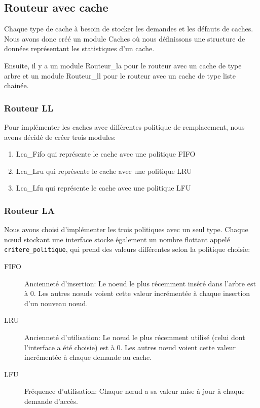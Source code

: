 \documentclass{article}
\begin{document}
\subsection{Routeur avec cache}
Chaque type de cache à besoin de stocker les demandes et les défauts de caches. Nous avons donc créé un module Caches où nous définissons une structure de données représentant les statistiques d'un cache.\par
Ensuite, il y a un module Routeur\_la pour le routeur avec un cache de type arbre et un module Routeur\_ll pour le routeur avec un cache de type liste chainée.

\subsubsection{Routeur LL}
Pour implémenter les caches avec différentes politique de remplacement, nous avons décidé de créer trois modules:
\begin{enumerate}
    \item Lca\_Fifo qui représente le cache avec une politique FIFO
    \item Lca\_Lru qui représente le cache avec une politique LRU
    \item Lca\_Lfu qui représente le cache avec une politique LFU
\end{enumerate}


\subsubsection{Routeur LA}
\label{routeur_la_choix}

Nous avons choisi d'implémenter les trois politiques avec un seul type. Chaque nœud stockant une interface stocke également un nombre flottant appelé \verb|critere_politique|, qui prend des valeurs différentes selon la politique choisie:

\begin{description}
    \item[FIFO] Ancienneté d'insertion: Le noeud le plus récemment inséré dans l'arbre est à 0. Les autres nœuds voient cette valeur incrémentée à chaque insertion d'un nouveau nœud.

    \item[LRU] Ancienneté d'utilisation: Le nœud le plus récemment utilisé (celui dont l'interface a été choisie) est à 0. Les autres nœud voient cette valeur incrémentée à chaque demande au cache.

    \item[LFU] Fréquence d'utilisation: Chaque nœud a sa valeur mise à jour à chaque demande d'accès.
\end{description}
\end{document}
